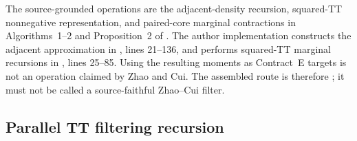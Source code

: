 The source-grounded operations are the adjacent-density recursion, squared-TT
nonnegative representation, and paired-core marginal contractions in
Algorithms~1--2 and Proposition~2 of \citet{zhao2024ttsequential}.  The author
implementation constructs the adjacent approximation in
,
lines 21--136, and performs squared-TT marginal recursions in
,
lines 25--85.  Using the resulting moments as Contract~E targets is not an
operation claimed by Zhao and Cui.  The assembled route is therefore
; it must not be called a source-faithful
Zhao--Cui filter.

\subsection{Parallel TT filtering recursion}

